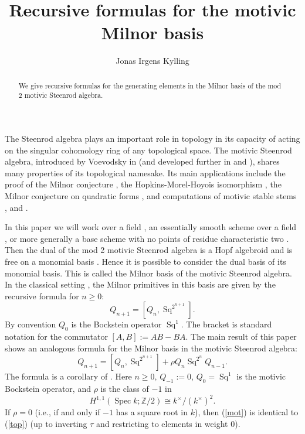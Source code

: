 \documentclass[11pt,hyp]{nyjm}
\title{Recursive formulas for the motivic Milnor basis}
\author{Jonas Irgens Kylling}
\newcommand{\ZZ}{\mathbb{Z}}
\newcommand{\Spec}{\operatorname{Spec}}
\newcommand{\Sq}{\operatorname{Sq}}
\theoremstyle{theoremstyle}
\theoremstyle{definition}
\theoremstyle{theoremstyle}
\begin{document}
 
\begin{abstract}  
  We give recursive formulas for the generating elements in the Milnor basis of the mod 2 motivic Steenrod algebra.
\end{abstract}
\maketitle
\tableofcontents

The Steenrod algebra plays an important role in topology in its capacity of acting on the singular cohomology ring of any topological space.
The motivic Steenrod algebra, introduced by Voevodsky in \cite{Voevodsky:power} (and developed further in \cite{Riou} and \cite{HKO}), shares many properties of its topological namesake. Its main applications include the proof of the Milnor conjecture \cite{Voevodsky:Z/2}, the Hopkins-Morel-Hoyois isomorphism \cite{Hoyois}, the Milnor conjecture on quadratic forms \cite{slices}, and computations of motivic stable stems \cite{Morel:CRAS}, \cite{DI:MASS} and \cite{April1}.

In this paper we will work over a field \cite{Voevodsky:power}, an essentially smooth scheme over a field \cite{HKO}, or more generally a base scheme with no points of residue characteristic two \cite{Spitzweck}.
Then the dual of the mod 2 motivic Steenrod algebra is a Hopf algebroid and is free on a monomial basis \cite{Voevodsky:power}.
Hence it is possible to consider the dual basis of its monomial basis. This is called the Milnor basis of the motivic Steenrod algebra.
In the classical setting \cite{Milnor}, the Milnor primitives in this basis are given by the recursive formula for $n \geq 0$:
\begin{equation}
  \label{top}
  Q_{n+1} = [Q_n, \Sq^{2^{n+1}}].
\end{equation}
By convention $Q_0$ is the Bockstein operator $\Sq^1$.
The bracket is standard notation for the commutator $[A, B] := AB - BA$.
The main result of this paper shows an analogous formula for the Milnor basis in the motivic Steenrod algebra:
\begin{equation}
  \label{mot}
  Q_{n+1} = [Q_n, \Sq^{2^{n+1}}] + \rho Q_n \Sq^{2^n} Q_{n-1}.
\end{equation}
The formula is a corollary of .
Here  $n \geq 0,\, Q_{-1} := 0$,
$Q_0 = \Sq^1$ is the motivic Bockstein operator,
and $\rho$ is the class of $-1$ in
\[
H^{1,1}(\Spec k; \ZZ/2) \cong k^\times/(k^\times)^2.
\]
If $\rho = 0$ (i.e., if and only if $-1$ has a square root in $k$), then (\ref{mot}) is identical to (\ref{top}) (up to inverting $\tau$ and restricting to elements in weight 0).
\end{document}
